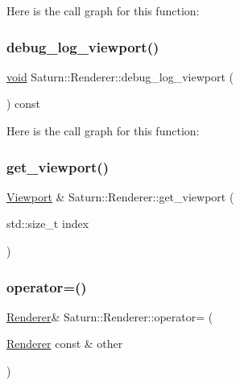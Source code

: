 Here is the call graph for this function\+:
\mbox{\label{class_saturn_1_1_renderer_a79c8a965dc33001d6f70b41b77c884f1}} 
\subsubsection{\texorpdfstring{debug\+\_\+log\+\_\+viewport()}{debug\_log\_viewport()}}
{\footnotesize\ttfamily \mbox{\hyperlink{glad_8h_a950fc91edb4504f62f1c577bf4727c29}{void}} Saturn\+::\+Renderer\+::debug\+\_\+log\+\_\+viewport (\begin{DoxyParamCaption}{ }\end{DoxyParamCaption}) const}

Here is the call graph for this function\+:
\mbox{\label{class_saturn_1_1_renderer_a98f0dd7d91ed42aa0816b67a2b3cff90}} 
\subsubsection{\texorpdfstring{get\+\_\+viewport()}{get\_viewport()}}
{\footnotesize\ttfamily \mbox{\hyperlink{class_saturn_1_1_viewport}{Viewport}} \& Saturn\+::\+Renderer\+::get\+\_\+viewport (\begin{DoxyParamCaption}\item[{std\+::size\+\_\+t}]{index }\end{DoxyParamCaption})}

\mbox{\label{class_saturn_1_1_renderer_aa07681b99dac69ffa21d515a17a60d0f}} 
\subsubsection{\texorpdfstring{operator=()}{operator=()}\hspace{0.1cm}{\footnotesize\ttfamily [1/2]}}
{\footnotesize\ttfamily \mbox{\hyperlink{class_saturn_1_1_renderer}{Renderer}}\& Saturn\+::\+Renderer\+::operator= (\begin{DoxyParamCaption}\item[{\mbox{\hyperlink{class_saturn_1_1_renderer}{Renderer}} const \&}]{other }\end{DoxyParamCaption})\hspace{0.3cm}{\ttfamily [delete]}}

